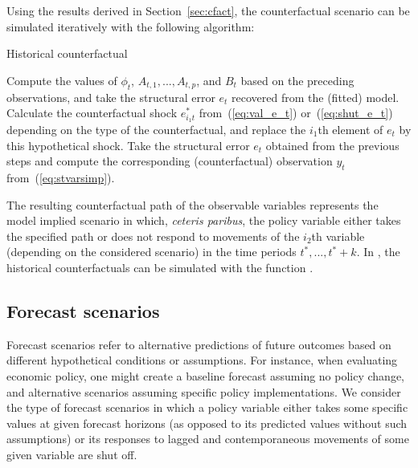\documentclass[nojss]{jss}
\begin{document}
Using the results derived in Section~\ref{sec:cfact}, the counterfactual scenario can be simulated iteratively with the following algorithm:
\begin{algorithm}[!ht]
\caption{Historical counterfactual}
\begin{algorithmic}[1]\label{algo:histcount}
    \STATE Compute the values of $\phi_{t}$, $A_{t,1},...,A_{t,p}$, and $B_t$ based on the preceding observations, and take the structural error $e_{t}$ recovered from the (fitted) model.
      \STATE Calculate the counterfactual shock $e_{i_1t}^*$ from~(\ref{eq:val_e_t}) or~(\ref{eq:shut_e_t}) depending on the type of the counterfactual, and replace the $i_1$th element of $e_{t}$ by this hypothetical shock.\label{step:hist_count_shock}
    \ENDIF
    \STATE Take the structural error $e_t$ obtained from the previous steps and compute the corresponding (counterfactual) observation $y_{t}$ from~(\ref{eq:stvarsimp}).
  \ENDFOR
\end{algorithmic}
\end{algorithm}

The resulting counterfactual path of the observable variables represents the model implied scenario in which, \textit{ceteris paribus}, the policy variable either takes the specified path or does not respond to movements of the $i_2$th variable (depending on the considered scenario) in the time periods $t^*,...,t^*+k$. In , the historical counterfactuals can be simulated with the function .


\subsection{Forecast scenarios}\label{sec:forescen}

Forecast scenarios refer to alternative predictions of future outcomes based on different hypothetical conditions or assumptions. For instance, when evaluating economic policy, one might create a baseline forecast assuming no policy change, and alternative scenarios assuming specific policy implementations. We consider the type of forecast scenarios in which a policy variable either takes some specific values at given forecast horizons (as opposed to its predicted values without such assumptions) or its responses to lagged and contemporaneous movements of some given variable are shut off.
\end{document}
